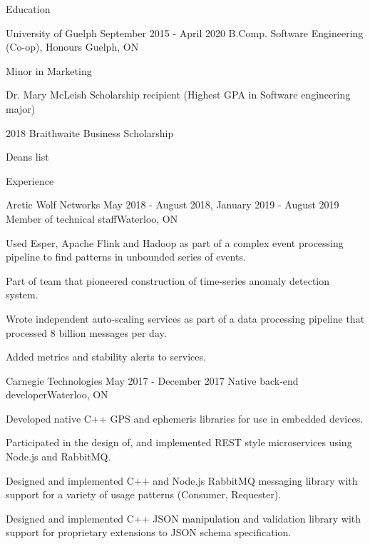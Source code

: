 \documentclass{resume}
\begin{document}
  \begin{rSection}{Education}
    \begin{rSubsection}{University of Guelph}
    	{September 2015 - April 2020}
    	{ B.Comp. Software Engineering (Co-op), Honours }{Guelph, ON}
    	\item { Minor in Marketing }
    	\item { Dr. Mary McLeish Scholarship recipient (Highest GPA in Software engineering major)} 
    	\item { 2018 Braithwaite Business Scholarship} 
    	\item { Deans list }
	\end{rSubsection}
  \end{rSection}

  \begin{rSection}{Experience}
    \begin{rSubsection}{Arctic Wolf Networks}
    	{May 2018 - August 2018, January 2019 - August 2019}
    	{Member of technical staff}{Waterloo, ON}
    \item Used Esper, Apache Flink and Hadoop as part of a complex event processing pipeline to find 
    patterns in unbounded series of events.
    \item Part of team that pioneered construction of time-series anomaly detection system.
    \item Wrote independent auto-scaling services as part of a data processing pipeline that processed 8 
    billion messages per day.
    \item Added metrics and stability alerts to services.
    \end{rSubsection}

    \begin{rSubsection}{Carnegie Technologies}
    	{May 2017 - December 2017}
    	{Native back-end developer}{Waterloo, ON}
    \item Developed native C++ GPS and ephemeris libraries for use in embedded devices.
    \item Participated in the design of, and implemented REST style microservices using Node.js and 
    RabbitMQ.
    \item Designed and implemented C++ and Node.js RabbitMQ messaging library with support for a variety 
    of usage patterns (Consumer, Requester).
    \item Designed and implemented C++ JSON manipulation and validation library with support for 
    proprietary extensions to JSON schema specification.
    \end{rSubsection}
  \end{rSection}
\end{document}
